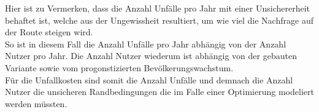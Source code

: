 Hier ist zu Vermerken, dass die Anzahl Unfälle pro Jahr mit einer Unsichererheit behaftet ist, welche aus der Ungewissheit resultiert, um wie viel die Nachfrage auf der Route steigen wird. \\ [2ex]
So ist in diesem Fall die Anzahl Unfälle pro Jahr abhängig von der Anzahl Nutzer pro Jahr. Die Anzahl Nutzer wiederum ist abhängig von der gebauten Variante sowie vom progonstizierten Bevölkerungswachstum. \\
Für die Unfallkosten sind somit die Anzahl Unfälle und demnach die Anzahl Nutzer die unsicheren Randbedingungen die im Falle einer Optimierung modeliert werden müssten.



%

